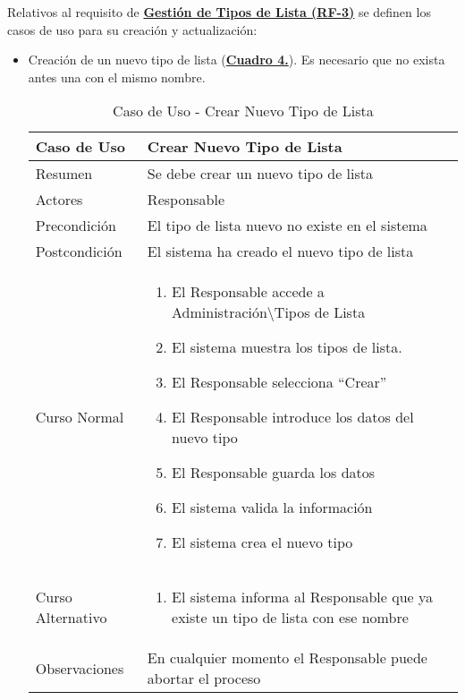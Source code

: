 Relativos al requisito de \textbf{\hyperref[tab:rfGestTipoLst]{Gestión de Tipos de Lista (RF-3)}} se definen los casos de uso para su creación y actualización:
\begin{itemize}
	\item \addtocounter{tabla}{1} Creación de un nuevo tipo de lista (\textbf{\hyperref[tab:curCrearTipoLst]{Cuadro 4.}}). Es necesario que no exista antes una con el mismo nombre.
		\begin{table}[!htbp]
		  \centering  \addtocounter{casouso}{1}
		  \begin{tabular}{|l | p{100mm}|}
		    \textbf{Caso de Uso}  & \textbf{Crear Nuevo Tipo de Lista} \\ \hline
		    Resumen 		 & Se debe crear un nuevo tipo de lista \\ \hline
		    Actores  		 & Responsable \\ \hline
		    Precondición  	 & El tipo de lista nuevo no existe en el sistema  \\ \hline
		    Postcondición  	 & El sistema ha creado el nuevo tipo de lista \\ \hline
		    Curso Normal   	 & \begin{enumerate}
			  \item El Responsable accede a Administración\textbackslash Tipos de Lista
			  \item El sistema muestra los tipos de lista.
			  \item El Responsable selecciona ``Crear''
			  \item El Responsable introduce los datos del nuevo tipo
			  \item El Responsable guarda los datos
			  \item El sistema valida la información
			  \item El sistema crea el nuevo tipo
		    \end{enumerate}  \\ \hline
		    Curso Alternativo  & \begin{enumerate}
			  \item El sistema informa al Responsable que ya existe un tipo de lista con ese nombre
		    \end{enumerate}  \\ \hline
		    Observaciones 	 & En cualquier momento el Responsable puede abortar el proceso  \\ \hline
		  \end{tabular}
		  \caption{Caso de Uso  - Crear Nuevo Tipo de Lista}
		  \label{tab:curCrearTipoLst}
		\end{table}
		\FloatBarrier


\end{itemize}
